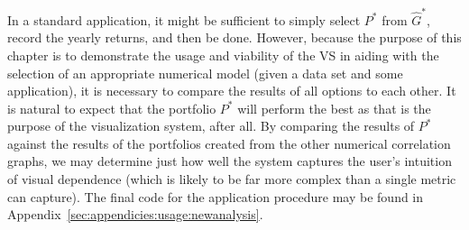 In a standard application, it might be sufficient to simply select $P^*$ from 
$\hat{G}^*$, record the 
yearly returns, and then be done. However, because the purpose of this chapter 
is to demonstrate the usage and viability of the VS in aiding with the 
selection of an appropriate numerical model (given a data set and some 
application), it is necessary to compare the results of all options to each 
other. 
It is natural to expect that the portfolio $P^*$ will perform the best 
as that is the purpose of the visualization system, after all. 
By comparing the results of $P^*$ against the results of the portfolios created 
from the other numerical correlation graphs, we may determine just how well the 
system captures the user's intuition of visual dependence (which is likely to 
be far more complex than a single metric can capture).
The final code for the application procedure may be found in 
Appendix~\ref{sec:appendicies:usage:newanalysis}.